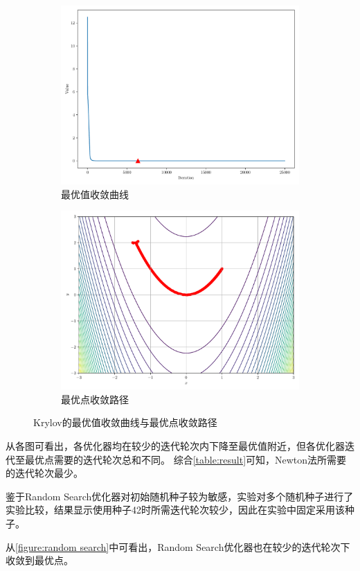 \begin{figure}[!ht]
    \centering
    \begin{subfigure}{0.4\textwidth}
        \centering
        \includegraphics[width=\textwidth]{figures/Krylov_loss.pdf}
        \caption{最优值收敛曲线}
    \end{subfigure}
    \begin{subfigure}{0.4\textwidth}
        \centering
        \includegraphics[width=\textwidth]{figures/Krylov_points.pdf}
        \caption{最优点收敛路径}
    \end{subfigure}
    \caption{Krylov的最优值收敛曲线与最优点收敛路径}
    \label{figure:krylov}
\end{figure}

从各图可看出，各优化器均在较少的迭代轮次内下降至最优值附近，但各优化器迭代至最优点需要的迭代轮次总和不同。
综合\cref{table:result}可知，Newton法所需要的迭代轮次最少。

鉴于Random Search优化器对初始随机种子较为敏感，实验对多个随机种子进行了实验比较，结果显示使用种子42时所需迭代轮次较少，因此在实验中固定采用该种子。

从\cref{figure:random search}中可看出，Random Search优化器也在较少的迭代轮次下收敛到最优点。
